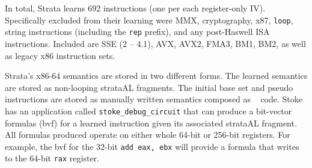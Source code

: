 In total, Strata learns 692 instructions (one per each register-only IV).
Specifically excluded from their learning were MMX, cryptography, x87, \texttt{loop}, string instructions (including the \texttt{rep} prefix), and any post-Haswell ISA instructions. 
 Included are SSE (2 -- 4.1), AVX, AVX2, FMA3, BM1, BM2, as well as legacy x86 instruction sets.  

Strata's x86-64 semantics are stored in two different forms. The learned semantics are stored as non-looping strataAL fragments. 
The initial base set and pseudo instructions are stored as manually written semantics composed as \CC~ code.
Stoke has an application called \texttt{stoke\_debug\_circuit} that can produce a bit-vector formulas (bvf) for a learned instruction given its associated strataAL fragment.
All formulas produced operate on either whole 64-bit or 256-bit registers. 
For example, the bvf for the 32-bit \texttt{add eax, ebx} will provide a formula that writes to the 64-bit \texttt{rax} register. 

